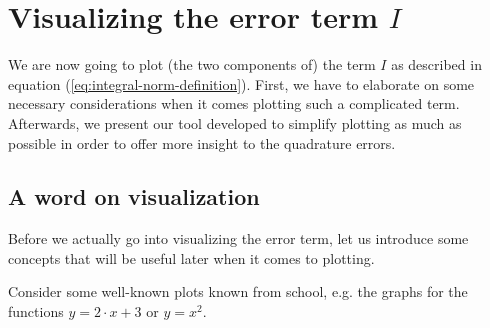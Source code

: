 \documentclass{article}
\begin{document}


\section{\texorpdfstring{Visualizing the error term $I$}{Visualizing the error term I}}
\label{sec:making-the-whole-thing-interactive}

We are now going to plot (the two components of) the term $I$ as described in equation (\ref{eq:integral-norm-definition}). First, we have to elaborate on some necessary considerations when it comes plotting such a complicated term.
Afterwards, we present our tool developed to simplify plotting as much as possible in order to offer more insight to the quadrature errors.

\subsection{A word on visualization}
\label{sec:a-word-on-visualization}

Before we actually go into visualizing the error term, let us introduce some concepts that will be useful later when it comes to plotting.

Consider some well-known plots known from school, e.g. the graphs for the functions $y=2\cdot x+3$ or $y=x^2$.
\end{document}
